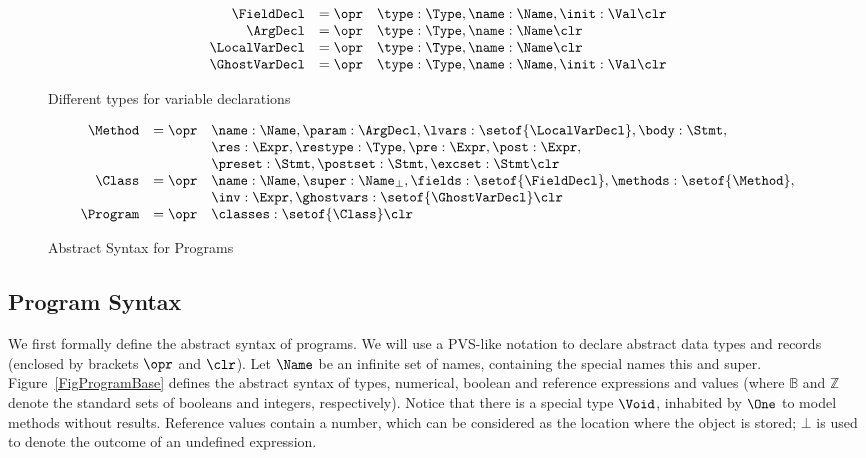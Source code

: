 \begin{figure}[t]
\[
\begin{array}{rcl}
\FieldDecl & = \opr & \type : \Type, \name : \Name, \init : \Val
\clr \\ 
\ArgDecl & = \opr & \type : \Type, \name : \Name \clr \\
\LocalVarDecl & = \opr & \type : \Type, \name : \Name \clr \\
\GhostVarDecl & = \opr & \type : \Type, \name : \Name, \init : \Val
\clr \\
\end{array}
\]
\caption{Different types for variable declarations}\label{FigDeclarations}
\end{figure}

\begin{figure}[t]
\[
\begin{array}{rcl}
\Method & = \opr & \name : \Name, 
                   \param : \ArgDecl, 
                   \lvars : \setof{\LocalVarDecl},
                   \body : \Stmt,\\
        &        & \res : \Expr,
                   \restype : \Type,
                   \pre : \Expr,
                   \post : \Expr, \\
        &        & \preset : \Stmt,
                   \postset : \Stmt,
                   \excset : \Stmt \clr \\
\Class & = \opr & \name : \Name,
                  \super : \Name_{\bot},
                  \fields : \setof{\FieldDecl},
                  \methods : \setof{\Method},\\
        &       & \inv : \Expr,
                  \ghostvars : \setof{\GhostVarDecl} \clr\\
\Program & = \opr & \classes : \setof{\Class} \clr
\end{array}
\]
\caption{Abstract Syntax for Programs}\label{FigProgram}
\end{figure}

\subsection{Program Syntax}\label{SecSyntax}

We first formally define the abstract syntax of programs. We will use
a PVS-like notation to declare abstract data types and records
(enclosed by brackets \(\opr\) and \(\clr\)). Let
\(\Name\) be an infinite set of names, containing the special names
\textsf{this} and \textsf{super}. Figure~\ref{FigProgramBase} defines
the abstract syntax of types, numerical, boolean and reference
expressions and values (where \(\mathbb{B}\) and \(\mathbb{Z}\) denote
the standard sets of booleans and integers, respectively). Notice that
there is a special type \(\Void\), inhabited by \(\One\) to model
methods without results. Reference values contain a number,
which can be considered as the location where the object is stored;
\(\bot\) is used to denote the outcome of an undefined expression.

